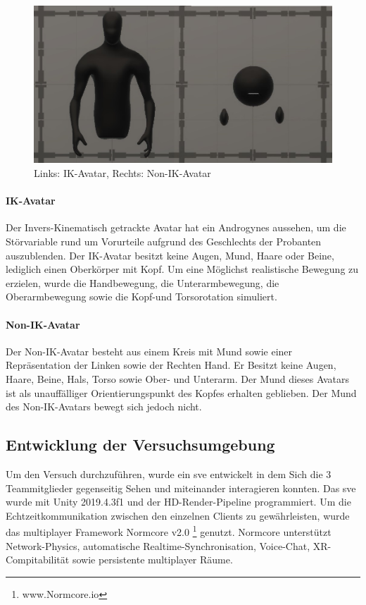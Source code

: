 \documentclass[a4paper,11pt]{article}%
\renewcommand{\\}{\vspace*{0.5\baselineskip} \newline}
\begin{document}
	\begin{figure}[H]
		\begin{footnotesize}
			\includegraphics[width=\textwidth]{Abbildungen/Avatars.JPG}\\
			\caption[Abbildung 1]{Links: IK-Avatar, Rechts: Non-IK-Avatar}
			\label{Framework}
		\end{footnotesize}
	\end{figure}

		\paragraph{IK-Avatar}
Der Invers-Kinematisch getrackte Avatar hat ein Androgynes aussehen, um die Störvariable rund um Vorurteile aufgrund des Geschlechts der Probanten auszublenden. Der IK-Avatar besitzt keine Augen, Mund, Haare oder Beine, lediglich einen Oberkörper mit Kopf.
Um eine Möglichst realistische Bewegung zu erzielen, wurde die Handbewegung, die Unterarmbewegung, die Oberarmbewegung sowie die Kopf-und Torsorotation simuliert.

		\paragraph{Non-IK-Avatar}
Der Non-IK-Avatar besteht aus einem Kreis mit Mund sowie einer Repräsentation der Linken sowie der Rechten Hand. Er Besitzt keine Augen, Haare, Beine, Hals, Torso sowie Ober- und Unterarm. Der Mund dieses Avatars ist als unauffälliger Orientierungspunkt des Kopfes erhalten geblieben. Der Mund des Non-IK-Avatars bewegt sich jedoch nicht. 
	\newpage

	\subsection{Entwicklung der Versuchsumgebung}
Um den Versuch durchzuführen, wurde ein \ac{sve} entwickelt in dem Sich die 3 Teammitglieder gegenseitig Sehen und miteinander interagieren konnten. 
Das \ac{sve} wurde mit Unity 2019.4.3f1 und der HD-Render-Pipeline programmiert. Um die Echtzeitkommunikation zwischen den einzelnen Clients zu gewährleisten, wurde das multiplayer Framework \dq{}Normcore v2.0\dq{} \footnote{www.Normcore.io} genutzt.
Normcore unterstützt Network-Physics, automatische Realtime-Synchronisation, Voice-Chat, XR-Compitabilität sowie persistente multiplayer Räume.	
\end{document}
